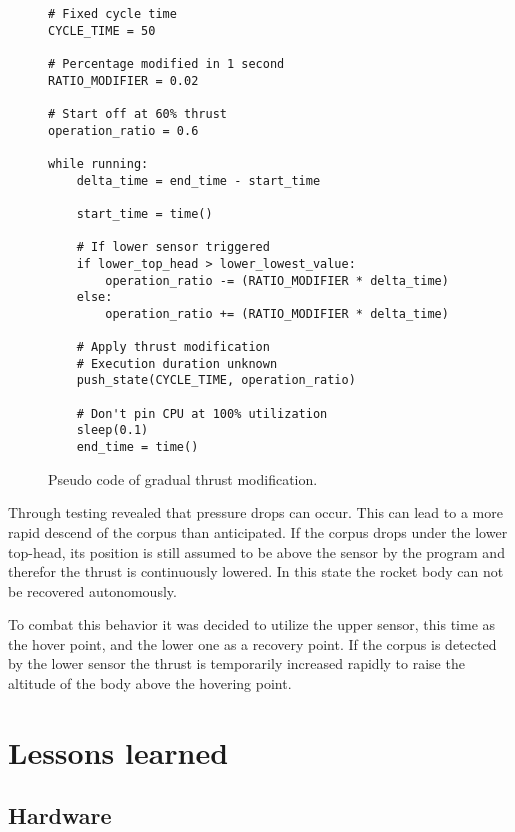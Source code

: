 \begin{figure}[h]
\begin{verbatim}
# Fixed cycle time
CYCLE_TIME = 50

# Percentage modified in 1 second
RATIO_MODIFIER = 0.02

# Start off at 60% thrust
operation_ratio = 0.6

while running:
    delta_time = end_time - start_time
    
    start_time = time()

    # If lower sensor triggered
    if lower_top_head > lower_lowest_value:
        operation_ratio -= (RATIO_MODIFIER * delta_time)
    else:
        operation_ratio += (RATIO_MODIFIER * delta_time)

    # Apply thrust modification
    # Execution duration unknown
    push_state(CYCLE_TIME, operation_ratio)

    # Don't pin CPU at 100% utilization
    sleep(0.1)
    end_time = time()
\end{verbatim}
\caption{Pseudo code of gradual thrust modification.}
\end{figure}

Through testing revealed that pressure drops can occur. This can lead to a more rapid descend of the corpus than anticipated. If the corpus drops under the lower top-head, its position is still assumed to be above the sensor by the program and therefor the thrust is continuously lowered. In this state the rocket body can not be recovered autonomously. 

To combat this behavior it was decided to utilize the upper sensor, this time as the hover point, and the lower one as a recovery point. If the corpus is detected by the lower sensor the thrust is temporarily increased rapidly to raise the altitude of the body above the hovering point. 

\section{Lessons learned}
\subsection{Hardware}
\author{Sebastian Schaffler}

